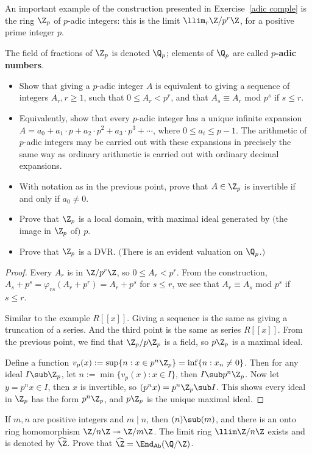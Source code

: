 \begin{exercise}
An important example of the construction presented in Exercise~\ref{adic comple} is the ring $\Z_p$ of $p$-adic integers: this is the limit $\llim_r\Z/p^r\Z$, for a positive prime integer $p$.\par
The field of fractions of $\Z_p$ is denoted $\Q_p$; elements of $\Q_p$ are called \textbf{$p$-adic numbers}.
\begin{itemize}
\item Show that giving a $p$-adic integer $A$ is equivalent to giving a sequence of integers $A_r, r\geq 1$, such that $0\leq A_r<p^r$, and that $A_s\equiv A_r$ mod $p^s$ if $s\leq r$.
\item Equivalently, show that every $p$-adic integer has a unique infinite expansion $A=a_0+a_1\cdot p+a_2\cdot p^2+a_3\cdot p^3+\cdots$, where $0\leq a_i\leq p-1$. The arithmetic of $p$-adic integers may be carried out with these expansions in precisely the same way as ordinary arithmetic is carried out with ordinary decimal expansions.
\item With notation as in the previous point, prove that $A\in\Z_p$ is invertible if and only if $a_0\neq 0$.
\item Prove that $\Z_p$ is a local domain, with maximal ideal generated by $($the image in $\Z_p$ of$)$ $p$.
\item Prove that $\Z_p$ is a DVR. $($There is an evident valuation on $\Q_p$.$)$
\end{itemize}
\end{exercise}
\begin{proof}
Every $A_r$ is in $\Z/p^r\Z$, so $0\leq A_r<p^r$. From the construction, $A_s+p^s=\varphi_{rs}(A_r+p^r)=A_r+p^s$ for $s\leq r$, we see that $A_r\equiv A_s$ mod $p^s$ if $s\leq r$.\par
Similar to the example $R[[x]]$. Giving a sequence is the same as giving a truncation of a series. And the third point is the same as series $R[[x]]$. From the previous point, we find that $\Z_p/p\Z_p$ is a field, so $p\Z_p$ is a maximal ideal.\par
Define a function $v_p(x):=\sup\{n:x\in p^n\Z_p\}=\inf\{n:x_n\neq 0\}$. Then for any ideal $I\sub\Z_p$, let $n:=\min\{v_p(x):x\in I\}$, then $I\sub p^n\Z_p$. Now let $y=p^nx\in I$, then $x$ is invertible, so $(p^nx)=p^n\Z_p\sub I$. This shows every ideal in $\Z_p$ has the form $p^n\Z_p$, and $p\Z_p$ is the unique maximal ideal.
\end{proof}
\begin{exercise}\label{completion of Z}
If $m,n$ are positive integers and $m\mid n$, then $(n)\sub (m)$, and there is an onto ring homomorphism $\Z/n\Z\twoheadrightarrow\Z/m\Z$. The limit ring $\llim\Z/n\Z$ exists and is denoted by $\widehat{\Z}$. Prove that $\widehat{\Z}=\End_{\mathsf{Ab}}(\Q/\Z)$. 
\end{exercise}
